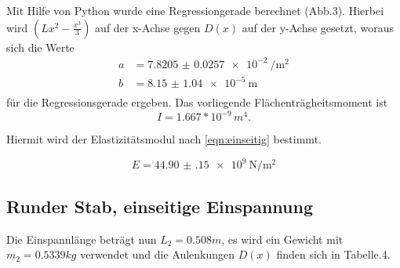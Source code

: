 Mit Hilfe von Python wurde eine Regressiongerade berechnet (Abb.3).
Hierbei wird $(Lx^2- \frac{x^3}{3})$ auf der x-Achse gegen $D(x)$ auf der y-Achse
gesetzt, woraus sich die Werte
\begin{align*}
  a &= \SI{7.8205(257)e-2}{\per\square\meter} \\
  b &= \SI{8.15(104)e-5}{\meter} \\
\end{align*}
für die Regressionsgerade ergeben.
\newline
Das vorliegende Flächenträgheitsmoment ist
\begin{equation*}
  I = 1.667* 10^{-9}\, m^4.
\end{equation*}

Hiermit wird der Elastizitätsmodul nach \ref{eqn:einseitig} bestimmt.

\begin{equation*}
  E = \SI{44.90(15)e9}{\newton\per\square\meter}
\end{equation*}
\newpage






\subsection{Runder Stab, einseitige Einspannung}
Die Einspannlänge beträgt nun $L_2 = 0.508m$, es wird ein Gewicht
mit $m_2 = 0.5339 kg $ verwendet und die Aulenkungen $D(x)$ finden
sich in Tabelle.4.

